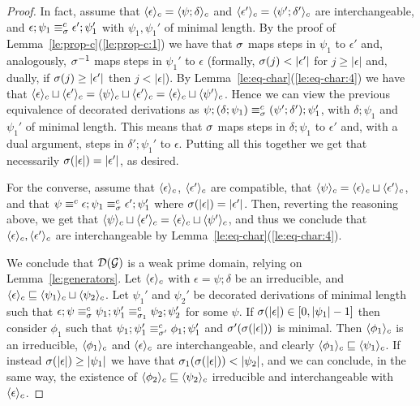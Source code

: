 \begin{proof}
   In fact, assume that $\ltrace{\epsilon} = \ltrace{\psi; \delta}$
   and $\ltrace{\epsilon'} = \ltrace{\psi';\delta'}$ are
   interchangeable, and
   $\epsilon; \psi_1 \equiv^c_{\perm} \epsilon' ; \psi_1'$ with
   $\psi_1, \psi_1'$ of minimal length. By the proof of
   Lemma~\ref{le:prop-c}(\ref{le:prop-c:1})
   we have that $\perm$ maps steps in $\psi_1$ to
   $\epsilon'$ and, analogously, $\perm^{-1}$ maps steps in
   $\psi_1'$ to $\epsilon$ (formally, $\perm(j) < |\epsilon'|$ for $j
   \geq |\epsilon|$ and, dually, if $\perm(j) \geq
   |\epsilon'|$ then $j <
   |\epsilon|$). By Lemma~\ref{le:eq-char}(\ref{le:eq-char:4}) we have
   that $\ltrace{\epsilon} \sqcup \ltrace{\epsilon'} = \ltrace{\psi}
   \sqcup \ltrace{\epsilon'} = \ltrace{\epsilon} \sqcup
   \ltrace{\psi'}$. Hence we can view the previous equivalence of
   decorated derivations as $\psi; (\delta ; \psi_1) \equiv^c_{\perm}
   (\psi'; \delta') ;\psi_1'$, with $\delta ; \psi_1$ and
   $\psi_1'$ of minimal length. This means that
   $\perm$ maps steps in $\delta;\psi_1$ to
   $\epsilon'$ and, with a dual argument, steps in
   $\delta';\psi_1'$ to
   $\epsilon$. Putting all this together we get that necessarily
   $\perm(|\epsilon|) = |\epsilon'|$, as desired.

   For the converse, assume that
   $\ltrace{\epsilon}$,
   $\ltrace{\epsilon'}$ are compatible, that $\ltrace{\psi} =
   \ltrace{\epsilon} \sqcup \ltrace{\epsilon'}$, and that $\psi
   \equiv^c \epsilon; \psi_1 \equiv^c_{\perm} \epsilon' ;
   \psi_1'$ where $\perm(|\epsilon|) =
   |\epsilon'|$. Then, reverting the reasoning above, we get that
   $\ltrace{\psi} \sqcup \ltrace{\epsilon'} = \ltrace{\epsilon} \sqcup
   \ltrace{\psi'}$, and thus we conclude that $\ltrace{\epsilon},
   \ltrace{\epsilon'}$ are interchangeable by
   Lemma~\ref{le:eq-char}(\ref{le:eq-char:4}).


  \medskip


  We conclude that $\dom{\mathcal{G}}$ is a weak prime domain, relying on
  Lemma~\ref{le:generators}. Let $\ltrace{\epsilon}$ with
  $\epsilon = \psi; \delta$ be an irreducible, and
  $\ltrace{\epsilon} \sqsubseteq \ltrace{\psi_1} \sqcup
  \ltrace{\psi_2}$.
  Let $\psi_1'$ and $\psi_2'$ be decorated derivations of minimal
  length such that
  $\epsilon;\psi \equiv^c_\perm \psi_1;\psi_1' \equiv^c_{\perm_1}
  \psi_2;\psi_2'$ for some $\psi$. If
  $\perm(|\epsilon|) \in \interval[0]{|\psi_1|-1}$ then consider
  $\phi_1$ such that
  $\psi_1;\psi_1' \equiv^c_{\perm'} \phi_1; \psi_1'$ and
  $\perm'(\perm(|\epsilon|))$ is minimal. Then $\ltrace{\phi_1}$ is an
  irreducible, $\ltrace{\phi_1}$ and $\ltrace{\epsilon}$ are
  interchangeable, and clearly
  $\ltrace{\phi_1} \sqsubseteq \ltrace{\psi_1}$. If instead
  $\perm(|\epsilon|) \geq |\psi_1|$ we have that
  $\perm_1(\perm(|\epsilon|)) < |\psi_2|$, and we can conclude, in the
  same way, the existence of
  $\ltrace{\phi_2} \sqsubseteq {\ltrace{\psi_2}}$ irreducible and
  interchangeable with $\ltrace{\epsilon}$.
\end{proof}



